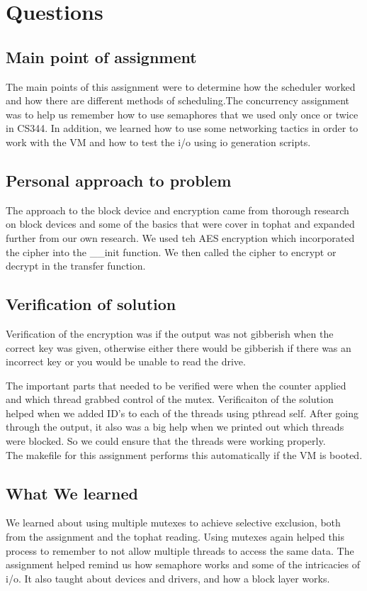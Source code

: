 \documentclass[letterpaper,10pt,titlepage]{article}
\begin{document}
\section{Questions}
\subsection{Main point of assignment}
The main points of this assignment were to determine how the scheduler worked and how there are different methods of scheduling.The concurrency assignment was to help us remember how to use semaphores that we used only once or twice in CS344.  In addition, we learned how to use some networking tactics in order to work with the VM and how to test the i/o using io generation scripts.

\subsection{Personal approach to problem}
The approach to the block device and encryption came from thorough research on block devices and some of the basics that were cover in tophat and expanded further from our own research.  We used teh AES encryption which incorporated the cipher into the __init function.  We then called the cipher to encrypt or decrypt in the transfer function.

\subsection{Verification of solution}
Verification of the encryption was if the output was not gibberish when the correct key was given, otherwise either there would be gibberish if there was an incorrect key or you would be unable to read the drive.

The important parts that needed to be verified were when the counter applied and which thread grabbed control of the mutex.  Verificaiton of the solution helped when we added ID's to each of the threads using pthread self.  After going through the output, it also was a big help when we printed out which threads were blocked. So we could ensure that the threads were working properly.\\

The makefile for this assignment performs this automatically if the VM is booted.


\subsection{What We learned}
We learned about using multiple mutexes to achieve selective exclusion, both from the assignment and the tophat reading. Using mutexes again helped this process to remember to not allow multiple threads to access the same data.  The assignment helped remind us how semaphore works and some of the intricacies of i/o.  It also taught about devices and drivers, and how a block layer works.
\end{document}
